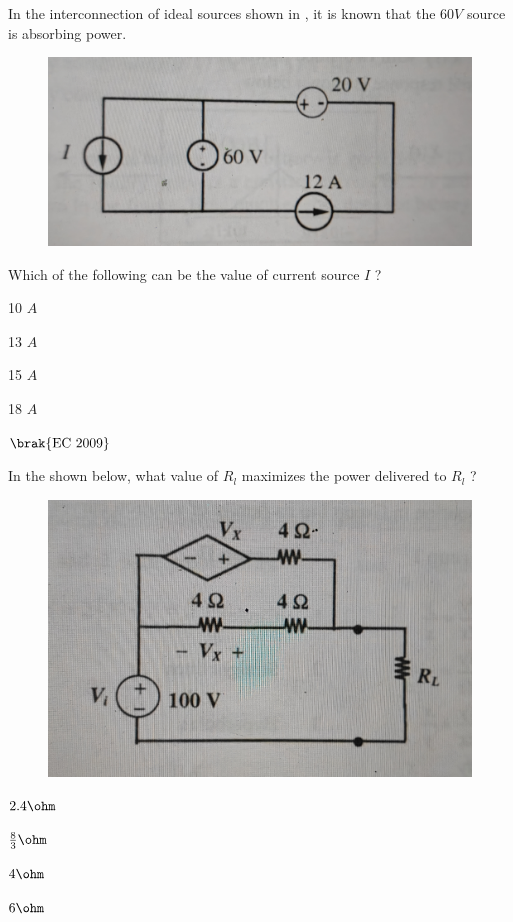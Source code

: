 \item In the interconnection of ideal sources shown in , it is known that the $60 V$ source is absorbing power.
\begin{figure}[H]
    \centering
    \includegraphics[width=0.7\columnwidth]{GATE/2009/EC/figs/fig_6.jpg}
    \caption{}
    \label{fig:placeholder_6}
\end{figure}
Which of the following can be the value of current source ${I}$ ?

\begin{enumerate}
\begin{multicols}{4}
\item 10 $A$
\item 13 $A$
\item 15 $A$
\item 18 $A$
\end{multicols}
\end{enumerate}
\hfill $\brak{\text{EC 2009}}$

\item In the  shown below, what value of $R_l$ maximizes the power delivered to $R_l$ ?
\begin{figure}[H]
    \centering
    \includegraphics[width=0.7\columnwidth]{GATE/2009/EC/figs/fig_11.jpg}
    \caption{}
    \label{fig:placeholder_11}
\end{figure}
\begin{enumerate}
    \begin{multicols}{4}
        \item $2.4 \ohm$
        \item $\frac{8}{3} \ohm$
        \item $4 \ohm$
        \item $6 \ohm$
    \end{multicols}
\end{enumerate}
\hfill {}

